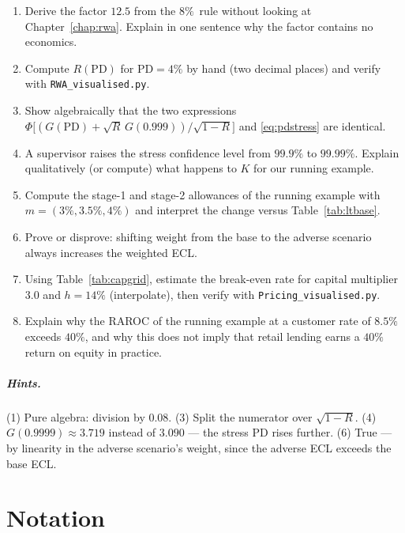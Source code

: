 \documentclass[11pt,a4paper]{report}
\theoremstyle{definition}
\theoremstyle{plain}
\newcommand{\PD}{\mathrm{PD}}
\begin{document}
\begin{enumerate}
\item Derive the factor $12.5$ from the $8\%$\ rule without looking at
      Chapter~\ref{chap:rwa}. Explain in one sentence why the factor
      contains no economics.
\item Compute $R(\PD)$ for $\PD=4\%$ by hand (two decimal places) and
      verify with \texttt{RWA\_visualised.py}.
\item Show algebraically that the two expressions
      $\Phi\!\bigl[(G(\PD)+\sqrt R\,G(0.999))/\sqrt{1-R}\bigr]$ and
      \eqref{eq:pdstress} are identical.
\item A supervisor raises the stress confidence level from
      $99.9\%$ to $99.99\%$. Explain qualitatively (or compute) what
      happens to $K$ for our running example.
\item Compute the stage-1 and stage-2 allowances of the running
      example with $m=(3\%,3.5\%,4\%)$ and interpret the change versus
      Table~\ref{tab:ltbase}.
\item Prove or disprove: shifting weight from the base to the adverse
      scenario always increases the weighted ECL.
\item Using Table~\ref{tab:capgrid}, estimate the break-even rate for
      capital multiplier 3.0 and $h=14\%$ (interpolate), then verify
      with \texttt{Pricing\_visualised.py}.
\item Explain why the RAROC of the running example at a customer rate
      of $8.5\%$ exceeds $40\%$, and why this does not imply that
      retail lending earns a $40\%$ return on equity in practice.
\end{enumerate}

\paragraph{Hints.} (1) Pure algebra: division by $0.08$. (3) Split the
numerator over $\sqrt{1-R}$. (4) $G(0.9999)\approx 3.719$ instead of
$3.090$ --- the stress PD rises further. (6) True --- by linearity in
the adverse scenario's weight, since the adverse ECL exceeds the base
ECL.

\appendix
\chapter{Notation}
\label{app:notation}
\end{document}
